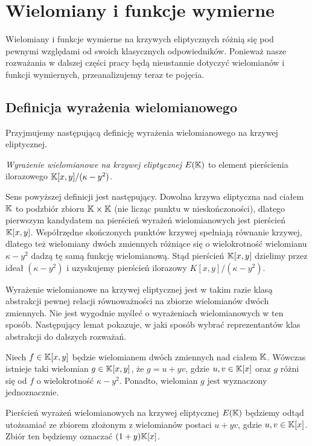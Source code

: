 \section{Wielomiany i funkcje wymierne}

Wielomiany i funkcje wymierne na krzywych eliptycznych
różnią się pod pewnymi względami od swoich klasycznych odpowiedników.
Ponieważ nasze rozważania w dalszej części pracy
będą nieustannie dotyczyć wielomianów i funkcji wymiernych,
przeanalizujemy teraz te pojęcia.

\subsection*{Definicja wyrażenia wielomianowego}

Przyjmujemy następującą definicję
wyrażenia wielomianowego na krzywej eliptycznej.

\begin{definition}
\emph{Wyrażenie wielomianowe na krzywej eliptycznej $E(\mathbb{K})$}
to element pierścienia ilorazowego
$\mathbb{K}[x,y]/(\kappa - y^2)$.
\end{definition}

Sens powyższej definicji jest następujący.
Dowolna krzywa eliptyczna nad ciałem $\mathbb{K}$ to podzbiór zbioru $\mathbb{K} \times \mathbb{K}$
(nie licząc punktu w nieskończoności),
dlatego pierwszym kandydatem na pierścień wyrażeń wielomianowych
jest pierścień $\mathbb{K}[x,y]$.
Współrzędne skończonych punktów krzywej spełniają równanie krzywej,
dlatego też wielomiany dwóch zmiennych różniące się
o wielokrotność wielomianu $\kappa- y^2$
dadzą tę samą funkcję wielomianową.
Stąd pierścień $\mathbb{K}[x,y]$ dzielimy przez ideał $(\kappa- y^2)$
i uzyskujemy pierścień ilorazowy $K[x,y]/(\kappa - y^2)$.

Wyrażenie wielomianowe na krzywej eliptycznej
jest w takim razie klasą abstrakcji
pewnej relacji równoważności na zbiorze wielomianów dwóch zmiennych.
Nie jest wygodnie myśleć o wyrażeniach wielomianowych w ten sposób.
Następujący lemat pokazuje,
w jaki sposób wybrać reprezentantów klas abstrakcji
do dalszych rozważań.

\begin{theorem}
Niech $f \in \mathbb{K}[x,y]$
będzie wielomianem dwóch zmiennych nad ciałem $\mathbb{K}$.
Wówczas istnieje taki wielomian $g \in \mathbb{K}[x,y]$,
że $g = u + yv$, gdzie $u, v \in \mathbb{K}[x]$
oraz $g$ różni się od $f$ o wielokrotność $\kappa - y^2$.
Ponadto, wielomian $g$ jest wyznaczony jednoznacznie.
\end{theorem}

\begin{remark}
Pierścień wyrażeń wielomianowych na krzywej eliptycznej $E(\mathbb{K})$
będziemy odtąd utożsamiać ze zbiorem
złożonym z wielomianów postaci $u + yv$,
gdzie $u, v \in \mathbb{K}[x]$.
Zbiór ten będziemy oznaczać $(1 + y)\mathbb{K}[x]$.
\end{remark}

